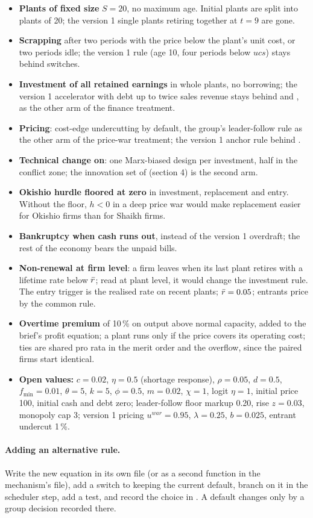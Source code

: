 \begin{itemize}
\item \textbf{Plants of fixed size} $S = 20$, no maximum age. Initial plants are split into
  plants of 20; the version 1 single plants retiring together at $t = 9$ are gone.
\item \textbf{Scrapping} after two periods with the price below the plant's unit cost, or
  two periods idle; the version 1 rule (age 10, four periods below $ucs$) stays behind
  switches.
\item \textbf{Investment of all retained earnings} in whole plants, no borrowing; the
  version 1 accelerator with debt up to twice sales revenue stays behind
   and , as the other arm of the finance treatment.
\item \textbf{Pricing}: cost-edge undercutting by default, the group's leader-follow rule
  as the other arm of the price-war treatment; the version 1 anchor rule behind
  .
\item \textbf{Technical change on}: one Marx-biased design per investment, half in the
  conflict zone; the innovation set of  (section 4) is the
  second arm.
\item \textbf{Okishio hurdle floored at zero} in investment, replacement and entry. Without
  the floor, $h < 0$ in a deep price war would make replacement easier for Okishio firms
  than for Shaikh firms.
\item \textbf{Bankruptcy when cash runs out}, instead of the version 1 overdraft; the rest
  of the economy bears the unpaid bills.
\item \textbf{Non-renewal at firm level}: a firm leaves when its last plant retires with a
  lifetime rate below $\bar r$; read at plant level, it would change the investment rule.
  The entry trigger is the realised rate on recent plants; $\bar r = 0.05$; entrants price
  by the common rule.
\item \textbf{Overtime premium} of 10\,\% on output above normal capacity, added to the
  brief's profit equation; a plant runs only if the price covers its operating cost; ties
  are shared pro rata in the merit order and the overflow, since the paired firms start
  identical.
\item \textbf{Open values:} $c = 0.02$, $\eta = 0.5$ (shortage response), $\rho = 0.05$,
  $d = 0.5$, $f_{\min} = 0.01$, $\theta = 5$, $k = 5$, $\phi = 0.5$, $m = 0.02$,
  $\chi = 1$, logit $\eta = 1$, initial price 100, initial cash and debt zero;
  leader-follow floor markup 0.20, rise $z = 0.03$, monopoly cap 3; version 1 pricing
  $u^{war} = 0.95$, $\lambda = 0.25$, $b = 0.025$, entrant undercut 1\,\%.
\end{itemize}

\paragraph{Adding an alternative rule.} Write the new equation in its own file (or as a
second function in the mechanism's file), add a switch to  keeping the
current default, branch on it in the scheduler step, add a test, and record the choice in
. A default changes only by a group decision recorded there.
